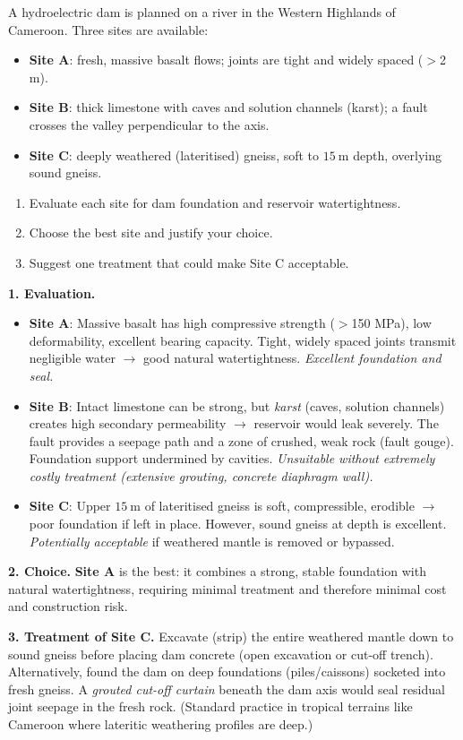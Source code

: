 \documentclass[11pt]{article}
\begin{document}
\begin{exoresolu}
A hydroelectric dam is planned on a river in the Western Highlands of Cameroon. Three sites are available:
\begin{itemize}
\item \textbf{Site A}: fresh, massive basalt flows; joints are tight and widely spaced ($>$2 m).
\item \textbf{Site B}: thick limestone with caves and solution channels (karst); a fault crosses the valley perpendicular to the axis.
\item \textbf{Site C}: deeply weathered (lateritised) gneiss, soft to $15\ \mathrm{m}$ depth, overlying sound gneiss.
\end{itemize}
\begin{enumerate}
\item Evaluate each site for dam foundation and reservoir watertightness.
\item Choose the best site and justify your choice.
\item Suggest one treatment that could make Site C acceptable.
\end{enumerate}
\tcblower
\textbf{1. Evaluation.}
\begin{itemize}
\item \textbf{Site A}: Massive basalt has high compressive strength ($>$150 MPa), low deformability, excellent bearing capacity. Tight, widely spaced joints transmit negligible water $\rightarrow$ good natural watertightness. \emph{Excellent foundation and seal.}
\item \textbf{Site B}: Intact limestone can be strong, but \emph{karst} (caves, solution channels) creates high secondary permeability $\rightarrow$ reservoir would leak severely. The fault provides a seepage path and a zone of crushed, weak rock (fault gouge). Foundation support undermined by cavities. \emph{Unsuitable without extremely costly treatment (extensive grouting, concrete diaphragm wall).}
\item \textbf{Site C}: Upper $15\ \mathrm{m}$ of lateritised gneiss is soft, compressible, erodible $\rightarrow$ poor foundation if left in place. However, sound gneiss at depth is excellent. \emph{Potentially acceptable} if weathered mantle is removed or bypassed.
\end{itemize}

\textbf{2. Choice.} \textbf{Site A} is the best: it combines a strong, stable foundation with natural watertightness, requiring minimal treatment and therefore minimal cost and construction risk.

\textbf{3. Treatment of Site C.} Excavate (strip) the entire weathered mantle down to sound gneiss before placing dam concrete (open excavation or cut-off trench). Alternatively, found the dam on deep foundations (piles/caissons) socketed into fresh gneiss. A \emph{grouted cut-off curtain} beneath the dam axis would seal residual joint seepage in the fresh rock. (Standard practice in tropical terrains like Cameroon where lateritic weathering profiles are deep.)
\end{exoresolu}
\end{document}
